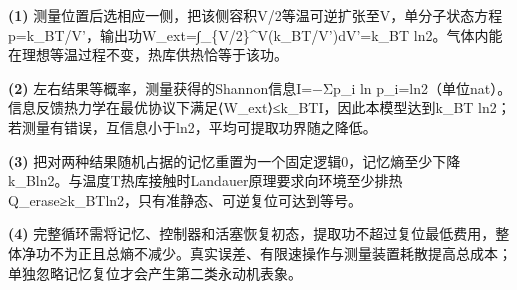 \par\noindent\textbf{(1)} 测量位置后选相应一侧，把该侧容积V/2等温可逆扩张至V，单分子状态方程p=k\_BT/V'，输出功W\_ext=∫\_\{V/2\}\textasciicircum{}V(k\_BT/V')dV'=k\_BT ln2。气体内能在理想等温过程不变，热库供热恰等于该功。
\par\noindent\textbf{(2)} 左右结果等概率，测量获得的Shannon信息I=−Σp\_i ln p\_i=ln2（单位nat）。信息反馈热力学在最优协议下满足⟨W\_ext⟩≤k\_BTI，因此本模型达到k\_BT ln2；若测量有错误，互信息小于ln2，平均可提取功界随之降低。
\par\noindent\textbf{(3)} 把对两种结果随机占据的记忆重置为一个固定逻辑0，记忆熵至少下降k\_Bln2。与温度T热库接触时Landauer原理要求向环境至少排热Q\_erase≥k\_BTln2，只有准静态、可逆复位可达到等号。
\par\noindent\textbf{(4)} 完整循环需将记忆、控制器和活塞恢复初态，提取功不超过复位最低费用，整体净功不为正且总熵不减少。真实误差、有限速操作与测量装置耗散提高总成本；单独忽略记忆复位才会产生第二类永动机表象。
